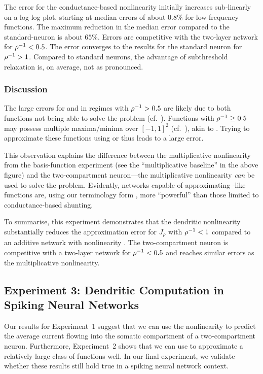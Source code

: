 The error for the conductance-based \twocomplif nonlinearity initially increases sub-linearly on a log-log plot, starting at median errors of about $0.8\%$ for low-frequency functions.
The maximum reduction in the median error compared to the standard-\LIF neuron is about $65\%$.
Errors are competitive with the two-layer network for ${\rho^{-1}} < 0.5$.
The error converges to the results for the standard \LIF neuron for ${\rho^{-1}} > 1$.
Compared to standard \LIF neurons, the advantage of subthreshold relaxation is, on average, not as pronounced.

\subsubsection{Discussion}
The large errors for \Hcur and \Hcond in regimes with ${\rho^{-1}} > 0.5$ are likely due to both functions not being able to solve the \XOR problem (cf.~).
Functions with ${\rho^{-1}} \geq 0.5$ may possess multiple maxima/minima over $[-1, 1]^2$ (cf.~), akin to \XOR.
Trying to approximate these functions using \Hcur or \Hcond thus leads to a large error.

This observation explains the difference between the multiplicative nonlinearity from the basis-function experiment (see the \enquote{multiplicative baseline} in the above figure) and the two-compartment \LIF neuron---the multiplicative nonlinearity \emph{can} be used to solve the \XOR problem.
Evidently, networks capable of approximating \XOR-like functions are, using our terminology form , more \enquote{powerful} than those limited to conductance-based shunting.

To summarise, this experiment demonstrates that the \twocomplif dendritic nonlinearity \Hcond substantially reduces the approximation error for $J_\rho$ with ${\rho^{-1}} < 1$ compared to an additive network with nonlinearity \Hcur.
The two-compartment neuron is competitive with a two-layer network for ${\rho^{-1}} < 0.5$ and reaches similar errors as the multiplicative nonlinearity.


\subsection{Experiment 3: Dendritic Computation in Spiking Neural Networks}
\label{sec:two_comp_lif_experiment_3}

Our results for Experiment~1 suggest that we can use the \twocomplif nonlinearity \Hcond to predict the average current flowing into the somatic compartment of a two-compartment neuron.
Furthermore, Experiment~2 shows that we can use \Hcond to approximate a relatively large class of functions well.
In our final experiment, we validate whether these results still hold true in a spiking neural network context.

